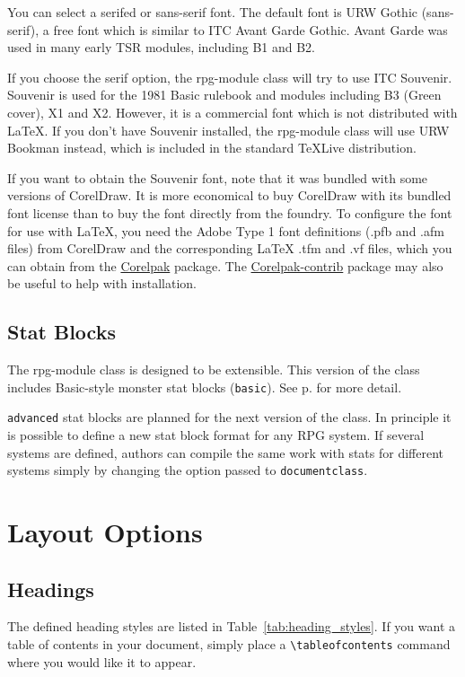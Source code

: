 \documentclass[a4paper,serif]{rpg-module}
\begin{document}
You can select a serifed or sans-serif font. The default font is URW Gothic (sans-serif), a free font which is similar to
ITC Avant Garde Gothic. Avant Garde was used in many early TSR modules, including B1 and B2.

If you choose the serif option, the rpg-module class will try to use ITC Souvenir. Souvenir is used for the 1981 Basic rulebook
and modules including B3 (Green cover), X1 and X2. However, it is a commercial font which is
not distributed with \LaTeX. If you don't have Souvenir installed, the rpg-module class will use URW Bookman instead, which is
included in the standard \TeX Live distribution.

If you want to obtain the Souvenir font, note that it was bundled with some versions of CorelDraw. It is more economical to buy
CorelDraw with its bundled font license than to buy the font directly from the foundry.
To configure the font for use with \LaTeX, you need the Adobe Type 1 font definitions (.pfb and .afm files) from CorelDraw
and the corresponding LaTeX .tfm and .vf files, which you can obtain from the \href{https://www.ctan.org/pkg/corelpak}{Corelpak} package. The
\href{https://www.ctan.org/pkg/corelpak-contrib}{Corelpak-contrib} package may also be useful to help with installation.

\subsection*{Stat Blocks}

The rpg-module class is designed to be extensible.  This version of the class includes Basic-style monster stat blocks
(\verb|basic|). See p.\pageref{stat_blocks} for more detail.

\verb|advanced| stat blocks are planned for the next version of the class. In principle it is possible to define a new stat
block format for any RPG system. If several systems are defined, authors can compile the same work with stats for different
systems simply by changing the option passed to \verb|documentclass|.

\section{Layout Options}

\subsection*{Headings}

The defined heading styles are listed in Table~\ref{tab:heading_styles}.
If you want a table of contents in your document, simply place a \verb|\tableofcontents| command where you would like it to appear.
\end{document}
